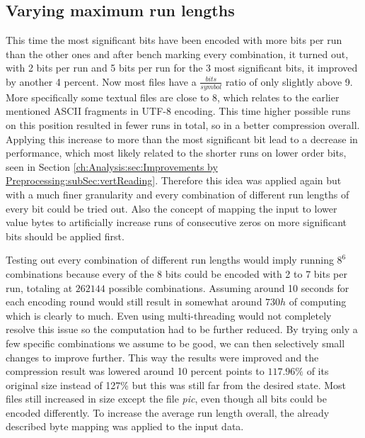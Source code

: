 \subsection{Varying maximum run lengths}
\label{ch:Conceptual Design:sec:var lengths}
\par{
This time the most significant bits have been encoded with more bits per run than the other ones and after bench marking every combination, it turned out, with 2 bits per run and 5 bits per run for the 3 most significant bits, it improved by another 4 percent. Now most files have a $\frac{bits}{symbol}$ ratio of only slightly above 9. More specifically some textual files are close to 8, which relates to the earlier mentioned ASCII fragments in UTF-8 encoding. This time higher possible runs on this position resulted in fewer runs in total, so in a better compression overall. Applying this increase to more than the most significant bit lead to a decrease in performance, which most likely related to the shorter runs on lower order bits, seen in Section \ref{ch:Analysis:sec:Improvements by Preprocessing:subSec:vertReading}. Therefore this idea was applied again but with a much finer granularity and every combination of different run lengths of every bit could be tried out. Also the concept of mapping the input to lower value bytes to artificially increase runs of consecutive zeros on more significant bits should be applied first.
}
\par{
Testing out every combination of different run lengths would imply running $8^6$ combinations because every of the 8 bits could be encoded with 2 to 7 bits per run, totaling at $262144$ possible combinations. Assuming around 10 seconds for each encoding round would still result in somewhat around $730h$ of computing which is clearly to much. Even using multi-threading would not completely resolve this issue so the computation had to be further reduced. By trying only a few specific combinations we assume to be good, we can then selectively small changes to improve further. This way the results were improved and the compression result was lowered around 10 percent points to $117.96\%$ of its original size instead of 127\% but this was still far from the desired state. Most files still increased in size except the file \textit{pic}, even though all bits could be encoded differently. To increase the average run length overall, the already described byte mapping was applied to the input data.
}

